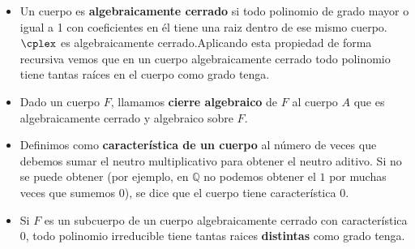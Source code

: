 \documentclass[nochap]{apuntes}
\begin{document}
\begin{itemize}
\item Un cuerpo es \textbf{algebraicamente cerrado} si todo polinomio de grado mayor o igual a 1 con coeficientes en él tiene una raiz dentro de ese mismo cuerpo. $\cplex$ es algebraicamente cerrado.Aplicando esta propiedad de forma recursiva vemos que en un cuerpo algebraicamente cerrado todo polinomio tiene tantas raíces en el cuerpo como grado tenga.

\item Dado un cuerpo $F$, llamamos \textbf{cierre algebraico} de $F$ al cuerpo $A$ que es algebraicamente cerrado y algebraico sobre $F$.

\item Definimos como \textbf{característica de un cuerpo} al número de veces que debemos sumar el neutro multiplicativo para obtener el neutro aditivo. Si no se puede obtener (por ejemplo, en $ℚ$ no podemos obtener el $1$ por muchas veces que sumemos $0$), se dice que el cuerpo tiene característica $0$.

\item Si $F$ es un subcuerpo de un cuerpo algebraicamente cerrado con característica 0, todo polinomio irreducible tiene tantas raices \textbf{distintas} como grado tenga.

\end{itemize}
\end{document}
